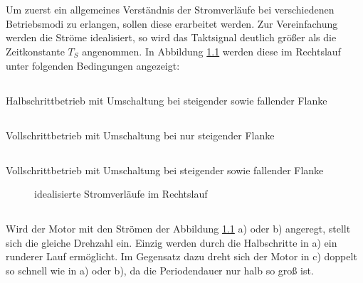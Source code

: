 \chapter{}\label{ch:aufg1}
Um zuerst ein allgemeines Verständnis der Stromverläufe bei verschiedenen Betriebsmodi zu erlangen, sollen diese erarbeitet werden. Zur Vereinfachung werden die Ströme idealisiert, so wird das Taktsignal deutlich größer als die Zeitkonstante $ T_{S} $ angenommen. In Abbildung \ref{fig:1:strom} werden diese im Rechtslauf unter folgenden Bedingungen angezeigt:
\section{}\label{sec:1a}
Halbschrittbetrieb mit Umschaltung bei steigender sowie fallender Flanke
\section{}\label{sec:1b}
Vollschrittbetrieb mit Umschaltung bei nur steigender Flanke
\section{}\label{sec:1c}
Vollschrittbetrieb mit Umschaltung bei steigender sowie fallender Flanke

\begin{figure}[h]
	\centering
	
	\label{fig:1:strom}
	\caption{idealisierte Stromverläufe im Rechtslauf}
\end{figure}

\section{}\label{sec:1d}
Wird der Motor mit den Strömen der Abbildung \ref{fig:1:strom} a) oder b) angeregt, stellt sich die gleiche Drehzahl ein. Einzig werden durch die Halbschritte in a) ein runderer Lauf ermöglicht. Im Gegensatz dazu dreht sich der Motor in c) doppelt so schnell wie in a) oder b), da die Periodendauer nur halb so groß ist.